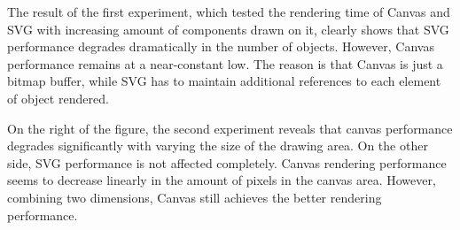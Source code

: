 The result of the first experiment, which tested the rendering time of Canvas and SVG with increasing amount of components drawn on it, clearly shows that SVG performance degrades dramatically in the number of objects. However, Canvas performance remains at a near-constant low. The reason is that Canvas is just a bitmap buffer, while SVG has to maintain additional references to each element of object rendered.

On the right of the figure, the second experiment reveals  that canvas performance degrades significantly with varying the size of the drawing area. On the other side, SVG performance is not affected completely. Canvas rendering performance seems to decrease  linearly in the amount of pixels in the canvas area. However, combining two dimensions, Canvas still achieves the better rendering performance.
